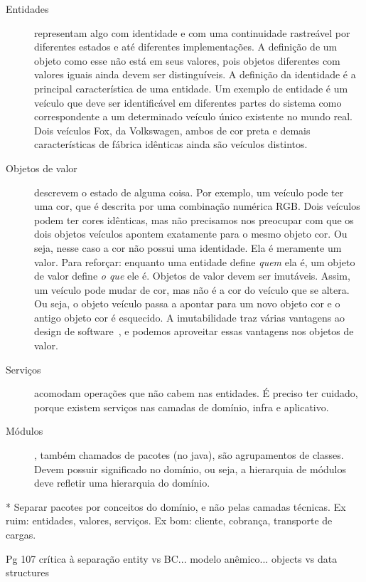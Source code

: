 \documentclass[a4paper, 12pt]{article}
\begin{document}
\begin{description}

\item [Entidades] representam algo com identidade e com uma continuidade rastreável por diferentes estados e até diferentes implementações. A definição de um objeto como esse não está em seus valores, pois objetos diferentes com valores iguais ainda devem ser distinguíveis. A definição da identidade é a principal característica de uma entidade. Um exemplo de entidade é um veículo que deve ser identificável em diferentes partes do sistema como correspondente a um determinado veículo único existente no mundo real. Dois veículos Fox, da Volkswagen, ambos de cor preta e demais características de fábrica idênticas ainda são veículos distintos.

\item [Objetos de valor] descrevem o estado de alguma coisa. Por exemplo, um veículo pode ter uma cor, que é descrita por uma combinação numérica RGB. Dois veículos podem ter cores idênticas, mas não precisamos nos preocupar com que os dois objetos veículos apontem exatamente para o mesmo objeto cor. Ou seja, nesse caso a cor não possui uma identidade. Ela é meramente um valor. Para reforçar: enquanto uma entidade define \emph{quem} ela é, um objeto de valor define \emph{o que} ele é. Objetos de valor devem ser imutáveis. Assim, um veículo pode mudar de cor, mas não é a cor do veículo que se altera. Ou seja, o objeto veículo passa a apontar para um novo objeto cor e o antigo objeto cor é esquecido. A imutabilidade traz várias vantagens ao design de software~\cite{Bloch2008}, e podemos aproveitar essas vantagens nos objetos de valor.

\item [Serviços] acomodam operações que não cabem nas entidades. É preciso ter cuidado, porque existem serviços nas camadas de domínio, infra e aplicativo.
\item [Módulos], também chamados de pacotes (no java), são agrupamentos de classes. Devem possuir significado no domínio, ou seja, a hierarquia de módulos deve refletir uma hierarquia do domínio.
\end{description}

* Separar pacotes por conceitos do domínio, e não pelas camadas técnicas. Ex ruim: entidades, valores, serviços. Ex bom: cliente, cobrança, transporte de cargas.

Pg 107 crítica à separação entity vs BC... modelo anêmico... objects vs data structures
\end{document}
